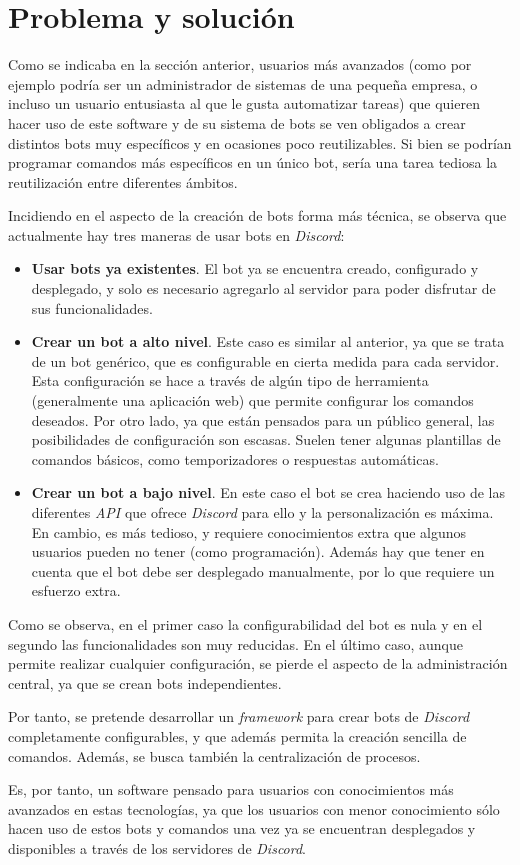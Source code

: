 \section{Problema y solución}

Como se indicaba en la sección anterior, usuarios más avanzados (como por ejemplo podría ser un administrador de sistemas de una pequeña empresa, o incluso un usuario entusiasta al que le gusta automatizar tareas) que quieren hacer uso de este software y de su sistema de bots se ven obligados a crear distintos bots muy específicos y en ocasiones poco reutilizables. Si bien se podrían programar comandos más específicos en un único bot, sería una tarea tediosa la reutilización entre diferentes ámbitos.

Incidiendo en el aspecto de la creación de bots forma más técnica, se observa que actualmente hay tres maneras de usar bots en \textit{Discord}:

\begin{itemize}
	\item \textbf{Usar bots ya existentes}. El bot ya se encuentra creado, configurado y desplegado, y solo es necesario agregarlo al servidor para poder disfrutar de sus funcionalidades.
	\item \textbf{Crear un bot a alto nivel}. Este caso es similar al anterior, ya que se trata de un bot genérico, que es configurable en cierta medida para cada servidor. Esta configuración se hace a través de algún tipo de herramienta (generalmente una aplicación web) que permite configurar los comandos deseados. Por otro lado, ya que están pensados para un público general, las posibilidades de configuración son escasas. Suelen tener algunas plantillas de comandos básicos, como temporizadores o respuestas automáticas.
	\item \textbf{Crear un bot a bajo nivel}. En este caso el bot se crea haciendo uso de las diferentes \textit{API} que ofrece \textit{Discord} para ello y la personalización es máxima. En cambio, es más tedioso, y requiere conocimientos extra que algunos usuarios pueden no tener (como programación). Además hay que tener en cuenta que el bot debe ser desplegado manualmente, por lo que requiere un esfuerzo extra.
\end{itemize}

Como se observa, en el primer caso la configurabilidad del bot es nula y en el segundo las funcionalidades son muy reducidas. En el último caso, aunque permite realizar cualquier configuración, se pierde el aspecto de la administración central, ya que se crean bots independientes. 

Por tanto, se pretende desarrollar un \textit{framework} para crear bots de \textit{Discord} completamente configurables, y que además permita la creación sencilla de comandos. Además, se busca también la centralización de procesos.

Es, por tanto, un software pensado para usuarios con conocimientos más avanzados en estas tecnologías, ya que los usuarios con menor conocimiento sólo hacen uso de estos bots y comandos una vez ya se encuentran desplegados y disponibles a través de los servidores de \textit{Discord}.
